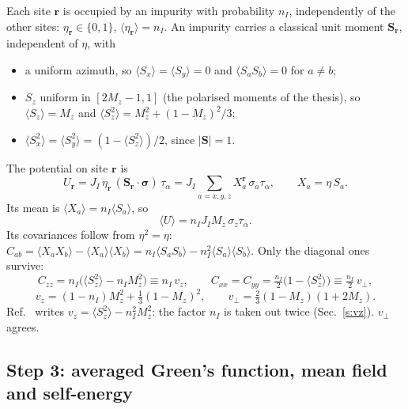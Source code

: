 \documentclass[11pt,a4paper]{article}
\begin{document}
Each site $\bm r$ is occupied by an impurity with probability $n_I$, independently of the other
sites: $\eta_{\bm r}\in\{0,1\}$, $\langle\eta_{\bm r}\rangle=n_I$. An impurity carries a classical unit
moment $\bm S_{\bm r}$, independent of $\eta$, with
\begin{itemize}
\item a uniform azimuth, so $\langle S_x\rangle=\langle S_y\rangle=0$ and $\langle S_aS_b\rangle=0$ for $a\ne b$;
\item $S_z$ uniform in $[2M_z-1,1]$ (the polarised moments of the thesis), so $\langle S_z\rangle=M_z$
  and $\langle S_z^2\rangle = M_z^2+(1-M_z)^2/3$;
\item $\langle S_x^2\rangle=\langle S_y^2\rangle=(1-\langle S_z^2\rangle)/2$, since $|\bm S|=1$.
\end{itemize}
The potential on site $\bm r$ is
\begin{equation}
U_{\bm r} = J_I\,\eta_{\bm r}\,(\bm S_{\bm r}\cdot\bm\sigma)\,\tau_\alpha = J_I\sum_{a=x,y,z}X^{\bm r}_a\,\sigma_a\tau_\alpha,
\qquad X_a=\eta\,S_a .
\end{equation}
Its mean is $\langle X_a\rangle = n_I\langle S_a\rangle$, so
\begin{equation}
\langle U\rangle = n_I J_I M_z\,\sigma_z\tau_\alpha .
\end{equation}
Its covariances follow from $\eta^2=\eta$:
$C_{ab}=\langle X_aX_b\rangle-\langle X_a\rangle\langle X_b\rangle = n_I\langle S_aS_b\rangle-n_I^2\langle S_a\rangle\langle S_b\rangle$. Only the
diagonal ones survive:
\begin{equation}
C_{zz} = n_I\big(\langle S_z^2\rangle-n_IM_z^2\big)\equiv n_I\,v_z,\qquad
C_{xx}=C_{yy}=\tfrac{n_I}{2}\big(1-\langle S_z^2\rangle\big)\equiv \tfrac{n_I}{2}\,v_\perp ,
\end{equation}
\begin{equation}
v_z=(1-n_I)M_z^2+\tfrac13(1-M_z)^2,\qquad v_\perp=\tfrac23(1-M_z)(1+2M_z).
\label{e:weights}
\end{equation}
Ref.~\cite{g2g1} writes $v_z=\langle S_z^2\rangle-n_I^2M_z^2$: the factor $n_I$ is taken out twice
(Sec.~\ref{s:vz}). $v_\perp$ agrees.

\subsection{Step 3: averaged Green's function, mean field and self-energy}\label{st:dyson}
\end{document}
